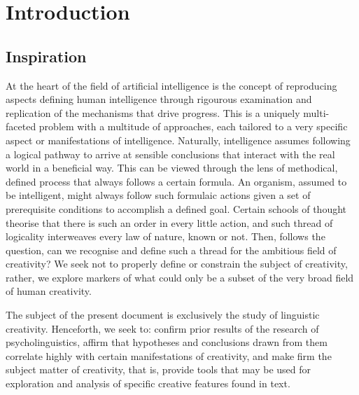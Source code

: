 \chapter{Introduction}
\label{chap:intro}

\section{Inspiration}
At the heart of the field of artificial intelligence is the concept of reproducing aspects defining human intelligence through rigourous examination and replication of the mechanisms that drive progress. This is a uniquely multi-faceted problem with a multitude of approaches, each tailored to a very specific aspect or manifestations of intelligence. Naturally, intelligence assumes following a logical pathway to arrive at sensible conclusions that interact with the real world in a beneficial way. This can be viewed through the lens of methodical, defined process that always follows a certain formula. An organism, assumed to be intelligent, might always follow such formulaic actions given a set of prerequisite conditions to accomplish a defined goal. Certain schools of thought theorise that there is such an order in every little action, and such thread of logicality interweaves every law of nature, known or not. Then, follows the question, can we recognise and define such a thread for the ambitious field of creativity? We seek not to properly define or constrain the subject of creativity, rather, we explore markers of what could only be a subset of the very broad field of human creativity.

The subject of the present document is exclusively the study of linguistic creativity. Henceforth, we seek to: confirm prior results of the research of psycholinguistics, affirm that hypotheses and conclusions drawn from them correlate highly with certain manifestations of creativity, and make firm the subject matter of creativity, that is, provide tools that may be used for exploration and analysis of specific creative features found in text.